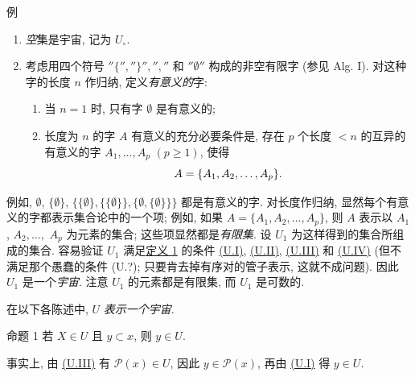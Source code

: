 \hypertarget{sga4.exp.I.appendix.II.sec.1.examples}{}
\begin{enonce*}[remark]{例}
\begin{enumerate}
\renewcommand{\labelenumi}{\theenumi)}
\hypertarget{sga4.exp.I.appendix.II.sec.1.example.1}{}
\item \emph{空}集是宇宙, 记为 $U_\circ$.

\hypertarget{sga4.exp.I.appendix.II.sec.1.example.2}{}
\item 考虑用四个符号 $''\{'',''\}'','',''$ 和 $''∅''$ 构成的非空有限字 (参见 Alg. I). 对这种字的长度 $n$ 作归纳\pageoriginale, 定义\emph{有意义的}字:
\begin{enumerate}
\renewcommand{\theenumii}{\alph{enumii}}
\renewcommand{\labelenumii}{(\theenumii)}
\item 当 $n=1$ 时, 只有字 $∅$ 是有意义的;

\item 长度为 $n$ 的字 $A$ 有意义的充分必要条件是, 存在 $p$ 个长度 $<n$ 的互异的有意义的字 $A_1,\ldots,A_p$ $(p\geq 1)$, 使得
$$
A=\{A_1,A_2,\dots,A_p\}{}.
$$
\end{enumerate}
\end{enumerate}
\end{enonce*}
\noindent 例如, $∅$, $\{∅\}$, $\{\{∅\},\{\{∅\}\},\{∅,\{∅\}\}\}$ 都是有意义的字. 对长度作归纳, 显然每个有意义的字都表示集合论中的一个项; 例如, 如果 $A=\{A_1,A_2,\ldots,A_p\}$, 则 $A$ 表示以 $A_1$, $A_2,\ldots,$ $A_p$ 为元素的集合; 这些项显然都是\emph{有限集}. 设 $U_1$ 为这样得到的集合所组成的集合. 容易验证 $U_1$ 满足\hyperlink{sga4.exp.I.appendix.II.sec.1.definition.1}{定义 1} 的条件 \hyperlink{sga4.exp.I.appendix.II.sec.1.definition.1.condition.U.I}{(U.I)}, \hyperlink{sga4.exp.I.appendix.II.sec.1.definition.1.condition.U.II}{(U.II)}, \hyperlink{sga4.exp.I.appendix.II.sec.1.definition.1.condition.U.III}{(U.III)} 和 \hyperlink{sga4.exp.I.appendix.II.sec.1.definition.1.condition.U.IV}{(U.IV)} (但不满足那个愚蠢的条件 (U.?); 只要肯去掉有序对的管子表示, 这就不成问题). 因此 $U_1$ 是一个\emph{宇宙}. 注意 $U_1$ 的元素都是有限集, 而 $U_1$ 是可数的.

在以下各陈述中, $U$ \emph{表示一个宇宙}.

\hypertarget{sga4.exp.I.appendix.II.sec.1.proposition.1}{}
\begin{enonce*}{命题 1}
若 $X\in U$ 且 $y\subset x$, 则 $y\in U$.
\end{enonce*}
事实上, 由 \hyperlink{sga4.exp.I.appendix.II.sec.1.definition.1.condition.U.III}{(U.III)} 有 $\mathcal{P}(x)\in U$, 因此 $y\in\mathcal{P}(x)$, 再由 \hyperlink{sga4.exp.I.appendix.II.sec.1.definition.1.condition.U.I}{(U.I)} 得 $y\in U$.

